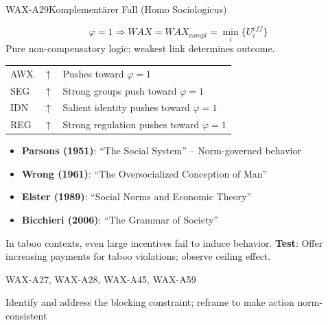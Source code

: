 \begin{axiomspec}{WAX-A29}{Komplementärer Fall (Homo Sociologicus)}

\begin{equation}
\varphi = 1 \Rightarrow WAX = WAX_{compl} = \min_i\{U_i^{eff}\}
\end{equation}
Pure non-compensatory logic; weakest link determines outcome.

\begin{tabular}{lll}
AWX & $\uparrow$ & Pushes toward $\varphi = 1$ \\
SEG & $\uparrow$ & Strong groups push toward $\varphi = 1$ \\
IDN & $\uparrow$ & Salient identity pushes toward $\varphi = 1$ \\
REG & $\uparrow$ & Strong regulation pushes toward $\varphi = 1$ \\
\end{tabular}

\begin{itemize}
\item \textbf{Parsons (1951)}: ``The Social System'' -- Norm-governed behavior
\item \textbf{Wrong (1961)}: ``The Oversocialized Conception of Man''
\item \textbf{Elster (1989)}: ``Social Norms and Economic Theory''
\item \textbf{Bicchieri (2006)}: ``The Grammar of Society''
\end{itemize}

In taboo contexts, even large incentives fail to induce behavior.
\textbf{Test}: Offer increasing payments for taboo violations; observe ceiling effect.

WAX-A27, WAX-A28, WAX-A45, WAX-A59

Identify and address the blocking constraint; reframe to make action norm-consistent

\end{axiomspec}


